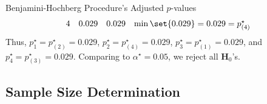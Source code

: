 \begin{itemize}
\begin{itemize}
\begin{Example}{Benjamini-Hochberg Procedure's Adjusted $ p $-values}{}
\[\begin{array}{cccl}
                                          4 & 0.029   & 0.029       & \min\set{0.029}=0.029=p_{(4)}^\star
                                    \end{array} \]
                              Thus, $ p_1^\star=p_{(2)}^\star=0.029 $, $ p_2^\star=p_{(4)}^\star=0.029 $, $ p_3^\star=p_{(1)}^\star=0.029 $,
                              and $ p_4^\star=p_{(3)}^\star=0.029 $. Comparing to $ \alpha^\star=0.05 $,
                              we reject all $ \mathbf{H}_{0} $'s.
                        \end{Example}
            \end{itemize}
\end{itemize}
\subsection{Sample Size Determination}
